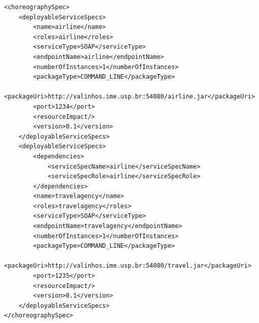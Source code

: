 {\footnotesize
\lstset{language=XML}
\begin{lstlisting}[caption=ChorSpec XML representation example, label=lst:chor_spec_xml]
<choreographySpec>
    <deployableServiceSpecs>
        <name>airline</name>
        <roles>airline</roles>
        <serviceType>SOAP</serviceType>
        <endpointName>airline</endpointName>
        <numberOfInstances>1</numberOfInstances>
        <packageType>COMMAND_LINE</packageType>
        <packageUri>http://valinhos.ime.usp.br:54080/airline.jar</packageUri>
        <port>1234</port>
        <resourceImpact/>
        <version>0.1</version>
    </deployableServiceSpecs>
    <deployableServiceSpecs>
        <dependencies>
            <serviceSpecName>airline</serviceSpecName>
            <serviceSpecRole>airline</serviceSpecRole>
        </dependencies>
        <name>travelagency</name>
        <roles>travelagency</roles>
        <serviceType>SOAP</serviceType>
        <endpointName>travelagency</endpointName>
        <numberOfInstances>1</numberOfInstances>
        <packageType>COMMAND_LINE</packageType>
        <packageUri>http://valinhos.ime.usp.br:54080/travel.jar</packageUri>
        <port>1235</port>
        <resourceImpact/>
        <version>0.1</version>
    </deployableServiceSpecs>
</choreographySpec>
\end{lstlisting}

}
